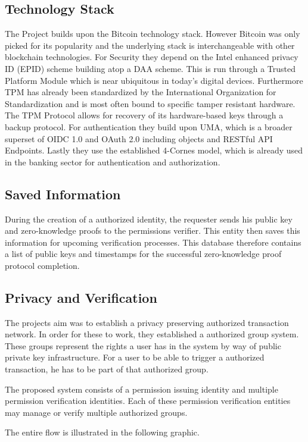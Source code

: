 \subsection{Technology Stack}
The Project builds upon the Bitcoin technology stack. However Bitcoin was only picked for its popularity and the underlying stack is interchangeable with other blockchain technologies. For Security they depend on the Intel enhanced privacy ID (EPID) scheme building atop a DAA scheme. This is run through a Trusted Platform Module which is near ubiquitous in today's digital devices. Furthermore TPM has already been standardized by the International Organization for Standardization and is most often bound to specific tamper resistant hardware. The TPM Protocol allows for recovery of its hardware-based keys through a backup protocol.
For authentication they build upon UMA, which is a broader superset of OIDC 1.0 and OAuth 2.0 including objects and RESTful API Endpoints.
Lastly they use the established 4-Cornes model, which is already used in the banking sector for authentication and authorization.

\subsection{Saved Information}
During the creation of a authorized identity, the requester sends his public key and zero-knowledge proofs to the permissions verifier. This entity then saves this information for upcoming verification processes. This database therefore contains a list of public keys and timestamps for the successful zero-knowledge proof protocol completion.

\subsection{Privacy and Verification}
The projects aim was to establish a privacy preserving authorized transaction network. In order for these to work, they established a authorized group system. These groups represent the rights a user has in the system by way of public private key infrastructure. For a user to be able to trigger a authorized transaction, he has to be part of that authorized group.

The proposed system consists of a permission issuing identity and multiple permission verification identities. Each of these permission verification entities may manage or verify multiple authorized groups.

The entire flow is illustrated in the following graphic.

